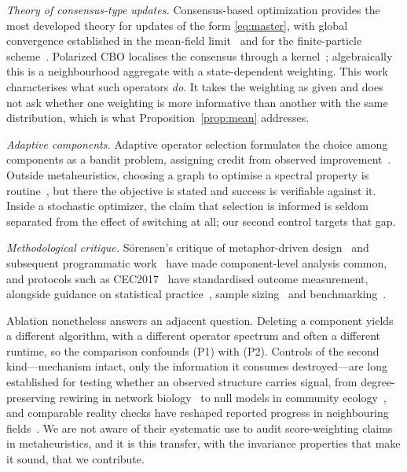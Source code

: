 \emph{Theory of consensus-type updates.} Consensus-based optimization provides
the most developed theory for updates of the form \eqref{eq:master}, with
global convergence established in the mean-field
limit~\cite{pinnau2017consensus,carrillo2018analytical} and for the
finite-particle scheme~\cite{fornasier2024cbo}. Polarized CBO localises the
consensus through a kernel~\cite{bungert2024polarized}; algebraically this is a
neighbourhood aggregate with a state-dependent weighting. This work
characterises what such operators \emph{do}. It takes the weighting as given
and does not ask whether one weighting is more informative than another with
the same distribution, which is what Proposition~\ref{prop:mean} addresses.

\emph{Adaptive components.} Adaptive operator selection formulates the choice
among components as a bandit problem, assigning credit from observed
improvement~\cite{fialho2010analyzing}. Outside metaheuristics, choosing a
graph to optimise a spectral property is routine~\cite{ghosh2006growing}, but
there the objective is stated and success is verifiable against it. Inside a
stochastic optimizer, the claim that selection is informed is seldom separated
from the effect of switching at all; our second control targets that gap.

\emph{Methodological critique.} S\"orensen's critique of metaphor-driven
design~\cite{sorensen2015metaheuristics} and subsequent programmatic
work~\cite{swan2022metaheuristics} have made component-level analysis common,
and protocols such as CEC2017~\cite{awad2016cec2017} have standardised outcome
measurement, alongside guidance on statistical
practice~\cite{derrac2011practical,garcia2009study}, sample
sizing~\cite{campelo2019sample} and benchmarking~\cite{bartz2020benchmarking}.

Ablation nonetheless answers an adjacent question. Deleting a component yields
a different algorithm, with a different operator spectrum and often a different
runtime, so the comparison confounds (P1) with (P2). Controls of the second
kind---mechanism intact, only the information it consumes destroyed---are long
established for testing whether an observed structure carries signal, from
degree-preserving rewiring in network biology~\cite{maslov2002specificity} to
null models in community ecology~\cite{gotelli2000null}, and comparable reality
checks have reshaped reported progress in neighbouring
fields~\cite{musgrave2020metric,lipton2019troubling}. We are not aware of their
systematic use to audit score-weighting claims in metaheuristics, and it is
this transfer, with the invariance properties that make it sound, that we
contribute.
